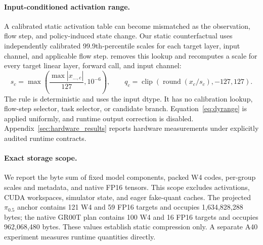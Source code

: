 \paragraph{Input-conditioned activation range.}
A calibrated static activation table can become mismatched as the observation, flow step, and policy-induced state change. Our static counterfactual uses independently calibrated 99.9th-percentile scales for each target layer, input channel, and applicable flow step. \dyrange removes this lookup and recomputes a scale for every target linear layer, forward call, and input channel:
\begin{equation}
 s_c=\max\!\left(\frac{\max |x_{\ldots,c}|}{127},10^{-6}\right),
 \qquad q_c=\operatorname{clip}\!\left(\operatorname{round}(x_c/s_c),-127,127\right).
 \label{eq:dyrange}
\end{equation}
The rule is deterministic and uses the input dtype. It has no calibration lookup, flow-step selector, task selector, or candidate branch. Equation~\ref{eq:dyrange} is applied uniformly, and runtime output correction is disabled. Appendix~\ref{sec:hardware_results} reports hardware measurements under explicitly audited runtime contracts.

\paragraph{Exact storage scope.}
We report the byte sum of fixed model components, packed W4 codes, per-group scales and metadata, and native FP16 tensors. This scope excludes activations, CUDA workspaces, simulator state, and eager fake-quant caches. The projected $\pi_{0.5}$ anchor contains 121 W4 and 59 FP16 targets and occupies 1,634,828,288 bytes; the native GR00T plan contains 100 W4 and 16 FP16 targets and occupies 962,068,480 bytes. These values establish static compression only. A separate A40 experiment measures runtime quantities directly.
